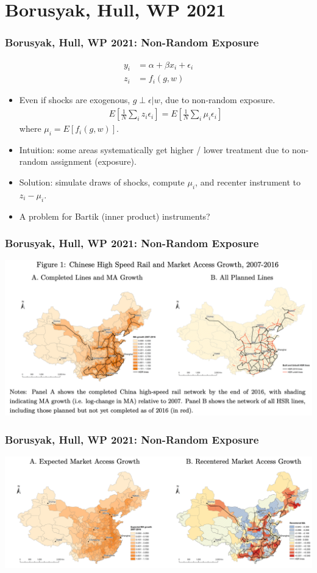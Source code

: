\documentclass[english,xcolor=svgnames]{beamer}
\begin{document}
\section{Borusyak, Hull, WP 2021}

\begin{frame}
\frametitle[alignment=center]{Borusyak, Hull, WP 2021: Non-Random Exposure}
\begin{align*}
		y_i &= \alpha + \beta x_i + \epsilon_i \\
		z_i &= f_i(g,w)
	\end{align*}
\begin{itemize}
	\item Even if shocks are exogenous, $g \perp \epsilon | w$, due to non-random exposure.
\begin{align*}
	E\left[\frac{1}{N}\sum_i z_i \epsilon_i \right] = E\left[\frac{1}{N}\sum_i \mu_i \epsilon_i \right]
\end{align*}
where $\mu_i = E[f_i(g,w)]$.
\item Intuition: some areas systematically get higher / lower treatment due to non-random assignment (exposure).
\item Solution: simulate draws of shocks, compute $\mu_i$, and recenter instrument to $z_i-\mu_i$.
\item A problem for Bartik (inner product) instruments?
\end{itemize}
\end{frame}


\begin{frame}
\frametitle[alignment=center]{Borusyak, Hull, WP 2021: Non-Random Exposure}
\centering
\includegraphics[scale=0.5]{figures/BHFIG1.png}
\end{frame}

\begin{frame}
\frametitle[alignment=center]{Borusyak, Hull, WP 2021: Non-Random Exposure}
\centering
\includegraphics[scale=0.5]{figures/BHFIG2.png}
\end{frame}
\end{document}

